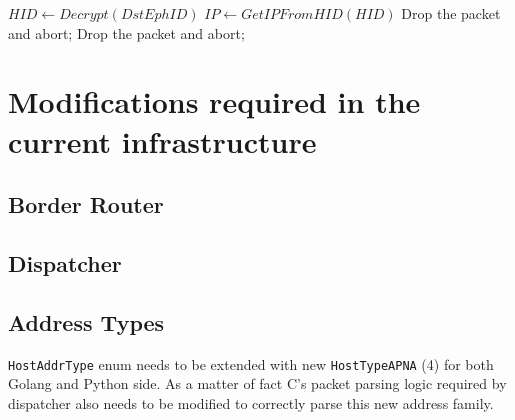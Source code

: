 \begin{algorithmic}
 \STATE $HID \leftarrow Decrypt(DstEphID)$
 \STATE $IP \leftarrow GetIPFromHID(HID)$
 \ELSE
 \STATE Drop the packet and abort; 
 \ENDIF
 \ELSE
 \STATE Drop the packet and abort;
 \ENDIF
\end{algorithmic}

\section{Modifications required in the current infrastructure}
\subsection{Border Router}
\subsection{Dispatcher}
\subsection{Address Types}
\texttt{HostAddrType} enum needs to be extended with new \texttt{HostTypeAPNA} (4) for both Golang and Python side. As a matter of fact C's packet parsing logic required by dispatcher also needs to be modified to correctly parse this new address family.
